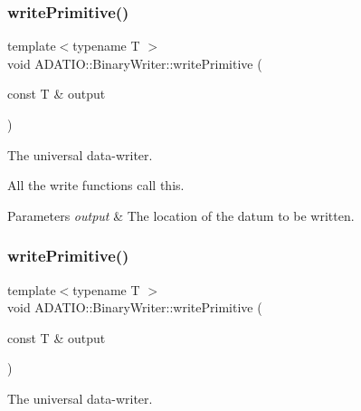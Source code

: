 \subsubsection{\texorpdfstring{writePrimitive()}{writePrimitive()}\hspace{0.1cm}{\footnotesize\ttfamily [1/3]}}
{\footnotesize\ttfamily template$<$typename T $>$ \\
void A\+D\+A\+T\+I\+O\+::\+Binary\+Writer\+::write\+Primitive (\begin{DoxyParamCaption}\item[{const T \&}]{output }\end{DoxyParamCaption})\hspace{0.3cm}{\ttfamily [protected]}}



The universal data-\/writer. 

All the write functions call this. 
\begin{DoxyParams}{Parameters}
{\em output} & The location of the datum to be written. \\
\hline
\end{DoxyParams}
\mbox{\label{classADATIO_1_1BinaryWriter_a4415e2d04de75ea6310a8eed3be8f43e}} 
\subsubsection{\texorpdfstring{writePrimitive()}{writePrimitive()}\hspace{0.1cm}{\footnotesize\ttfamily [2/3]}}
{\footnotesize\ttfamily template$<$typename T $>$ \\
void A\+D\+A\+T\+I\+O\+::\+Binary\+Writer\+::write\+Primitive (\begin{DoxyParamCaption}\item[{const T \&}]{output }\end{DoxyParamCaption})\hspace{0.3cm}{\ttfamily [protected]}}



The universal data-\/writer. 

